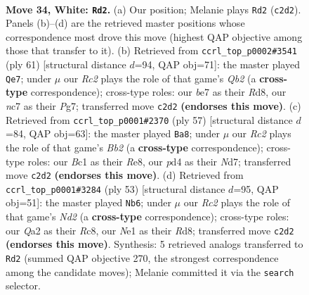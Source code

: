 \documentclass[11pt]{article}
\begin{document}
\clearpage

\begin{figure}[p]\centering
\begin{subfigure}{0.46\textwidth}\centering
\resizebox{\linewidth}{!}{%
\newchessgame
\chessboard[
  setfen={1rb3k1/p1nqbrn1/8/P1p2p1p/3p1Pp1/1P4P1/Q1R1P1BP/1RBNN1K1 w - - 0 34},
  showmover=false,
  pgfstyle=straightmove, color=movearrow, markmove={c2-d2}
]}
\caption{}
\end{subfigure}\hfill
\begin{subfigure}{0.46\textwidth}\centering
\resizebox{\linewidth}{!}{%
\newchessgame
\chessboard[
  setfen={br1r2k1/1q3pp1/pp1pp1np/8/1PP1P2b/P1N1BP1P/2RQ2P1/3R1BK1 b - - 0 31},
  showmover=false,
  pgfstyle=straightmove, color=movearrow, markmove={b7-e7}
]}
\caption{}
\end{subfigure}
\\[4pt]
\begin{subfigure}{0.46\textwidth}\centering
\resizebox{\linewidth}{!}{%
\newchessgame
\chessboard[
  setfen={1q1rrbk1/1b1n1pp1/pp1pp2p/8/P1P1P2P/1P3PP1/1BNR2BK/3QR3 b - - 2 29},
  showmover=false,
  pgfstyle=straightmove, color=movearrow, markmove={b7-a8}
]}
\caption{}
\end{subfigure}\hfill
\begin{subfigure}{0.46\textwidth}\centering
\resizebox{\linewidth}{!}{%
\newchessgame
\chessboard[
  setfen={2rr1bk1/q2n1ppp/2p1p3/4P3/bpPP3P/p3N1P1/P2R1PB1/B1R1Q1K1 b - - 0 27},
  showmover=false,
  pgfstyle=straightmove, color=movearrow, markmove={d7-b6}
]}
\caption{}
\end{subfigure}
\caption{\textbf{Move 34, White: \texttt{Rd2}.} (a) Our position; Melanie plays \texttt{Rd2} (\texttt{c2d2}). Panels (b)--(d) are the retrieved master positions whose correspondence most drove this move (highest QAP objective among those that transfer to it). (b) Retrieved from \texttt{ccrl\_top\_p0002\#3541} (ply 61) [structural distance $d$=94, QAP obj=71]: the master played \texttt{Qe7}; under $\mu$ our \emph{Rc2} plays the role of that game's \emph{Qb2} (a \textbf{cross-type} correspondence); cross-type roles: our \emph{b}e7 as their \emph{R}d8, our \emph{n}c7 as their \emph{P}g7; transferred move \texttt{c2d2} \textbf{(endorses this move)}. (c) Retrieved from \texttt{ccrl\_top\_p0001\#2370} (ply 57) [structural distance $d$=84, QAP obj=63]: the master played \texttt{Ba8}; under $\mu$ our \emph{Rc2} plays the role of that game's \emph{Bb2} (a \textbf{cross-type} correspondence); cross-type roles: our \emph{B}c1 as their \emph{R}e8, our \emph{p}d4 as their \emph{N}d7; transferred move \texttt{c2d2} \textbf{(endorses this move)}. (d) Retrieved from \texttt{ccrl\_top\_p0001\#3284} (ply 53) [structural distance $d$=95, QAP obj=51]: the master played \texttt{Nb6}; under $\mu$ our \emph{Rc2} plays the role of that game's \emph{Nd2} (a \textbf{cross-type} correspondence); cross-type roles: our \emph{Q}a2 as their \emph{R}c8, our \emph{N}e1 as their \emph{R}d8; transferred move \texttt{c2d2} \textbf{(endorses this move)}. Synthesis: 5 retrieved analogs transferred to \texttt{Rd2} (summed QAP objective 270, the strongest correspondence among the candidate moves); Melanie committed it via the \texttt{search} selector.}

\end{figure}
\end{document}
